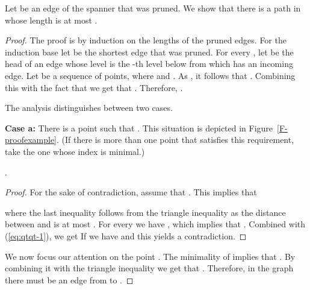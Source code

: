 \documentclass[proceedings]{stacs}
\theoremstyle{plain}\newtheorem{satz}[thm]{Satz}
\theoremstyle{definition}\newtheorem{crucial}[thm]{Crucial Definition}
\begin{document}
\begin{lemma}\label{L-Stretch1}
Let  be an edge of the spanner  that was pruned. We show
that there is a path in  whose length is at most
.
\end{lemma}
\begin{proof}
The proof is by induction on the lengths of the pruned edges. For
the induction base let  be the shortest edge that was
pruned. For every , let  be the head of an edge
whose level is the -th level below  from which
 has an incoming edge. Let  be a
sequence of points, where   and . As
, it follows that . Combining this with the fact that
 we get that
. Therefore,
.

The analysis distinguishes between two cases.

{\bf Case a:} There is a point  such that . This situation is depicted in
Figure~\ref{F-proofexample}. (If there is more than one point that
satisfies this requirement, take the one whose index is minimal.)

\par\bigskip{}
.

\begin{proof}
For the sake of contradiction, assume that
. This implies
that

where the last inequality follows from the triangle inequality as
the distance between  and  is at most .
For every  we have , which implies that
.
Combined with (\ref{eq:qtqt-1}), we get
 If  we have  and this yields a
contradiction.
\end{proof}

We now focus our attention on the point .  The minimality
of  implies that .
By combining it with the triangle inequality we get that
. Therefore,
in the graph  there must be an edge from  to .


\end{proof}
\end{document}
